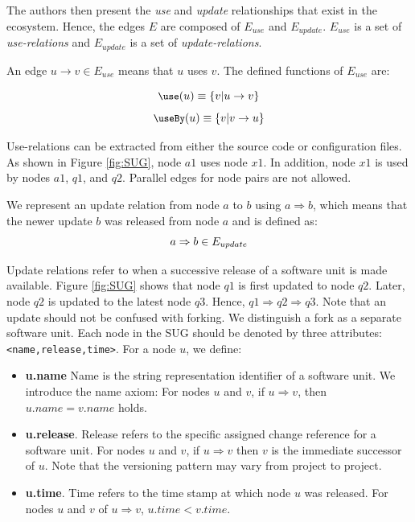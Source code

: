 The authors then present the \textit{use} and \textit{update} relationships that exist in the ecosystem.
Hence, the edges $E$ are composed of $E_{use}$ and $E_{update}$. $E_{use}$ is a set of \textit{use-relations} and $E_{update}$ is a set of \textit{update-relations}.

\begin{definition}
An edge $u \rightarrow v \in E_{use}$ means that $u$ uses $v$. The defined functions of $E_{use}$ are:

\begin{equation}
\small
\small \use(u)\equiv \{v|u \rightarrow v\}
\normalsize
\end{equation}
\begin{equation}
\small
\small \useBy(u)\equiv \{v|v \rightarrow u\}
\normalsize
\end{equation}
\end{definition}

Use-relations can be extracted from either the source code or configuration files. 
As shown in Figure \ref{fig:SUG}, node $a1$ uses node $x1$. 
In addition, node $x1$ is used by nodes $a1$, $q1$, and $q2$. Parallel edges for node pairs are not allowed.

\begin{definition}
We represent an update relation from node $a$ to $b$ using $ a \Rightarrow b $, which means that the newer update $b$ was released from node $a$ and is defined as:
\begin{equation}
\small a \Rightarrow b \in E_{update}
\end{equation}
\end{definition}

Update relations refer to when a successive release of a software unit is made available. Figure \ref{fig:SUG} shows that node $q1$ is first updated to node $q2$. Later, node $q2$ is updated to the latest node $q3$. Hence, $q1 \Rightarrow q2 \Rightarrow q3$.
Note that an update should not be confused with forking. 
We distinguish a fork as a separate software unit. 
Each node in the SUG should be denoted by three attributes: \texttt{<name,release,time>}.  
For a node $u$, we define:

\begin{itemize}
	\item \textbf{u.name} Name is the string representation identifier of a software unit.
	We introduce the name axiom: For nodes $u$ and $v$, if $u \Rightarrow v$, then $u.name = v.name$ holds.
	
	\item \textbf{u.release}. Release refers to the specific assigned change reference for a software unit. For nodes $u$ and $v$, if $u \Rightarrow v$
	then $v$ is the immediate successor of $u$. Note that the versioning pattern may vary from project to project. 
	\item \textbf{u.time}. Time refers to the time stamp at which node $u$ was released. For nodes $u$ and $v$ of $u \Rightarrow v$, $u.time < v.time$.
\end{itemize}

